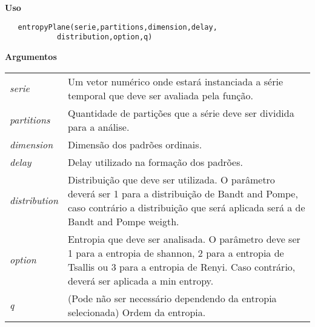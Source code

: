\textbf{Uso}

\begin{lstlisting}
   entropyPlane(serie,partitions,dimension,delay,
   			distribution,option,q)
\end{lstlisting}

\vspace{0.5cm}

\textbf{Argumentos}

\begin{table}[!ht]
\begin{center}
\begin{tabularx}{\textwidth}{X X}
\hspace{0.5cm} \textit{serie} \vspace{0.5cm}& Um vetor numérico onde estará instanciada a série temporal que deve ser avaliada pela função.\vspace{0.5cm}\\
\hspace{0.5cm} \textit{partitions} \vspace{0.5cm}& Quantidade de partições que a série deve ser dividida para a análise.\vspace{0.5cm}\\
\hspace{0.5cm} \textit{dimension} \vspace{0.5cm}& Dimensão dos padrões ordinais.\vspace{0.5cm}\\
\hspace{0.5cm} \textit{delay} \vspace{0.5cm}& Delay utilizado na formação dos padrões.\vspace{0.5cm}\\
\hspace{0.5cm} \textit{distribution} \vspace{0.5cm}& Distribuição que deve ser utilizada. O parâmetro deverá ser 1 para a distribuição de Bandt and Pompe, caso contrário a distribuição que será aplicada será a de Bandt and Pompe weigth.\vspace{0.5cm}\\
\hspace{0.5cm} \textit{option} \vspace{0.5cm}& Entropia que deve ser analisada. O parâmetro deve ser 1 para a entropia de shannon, 2 para a entropia de Tsallis ou 3 para a entropia de Renyi. Caso contrário, deverá ser aplicada a min entropy.\vspace{0.5cm}\\
\hspace{0.5cm} \textit{q} \vspace{0.5cm}& (Pode não ser necessário dependendo da entropia selecionada) Ordem da entropia.\vspace{0.5cm}\\
\end{tabularx}
\end{center}
\end{table} 

